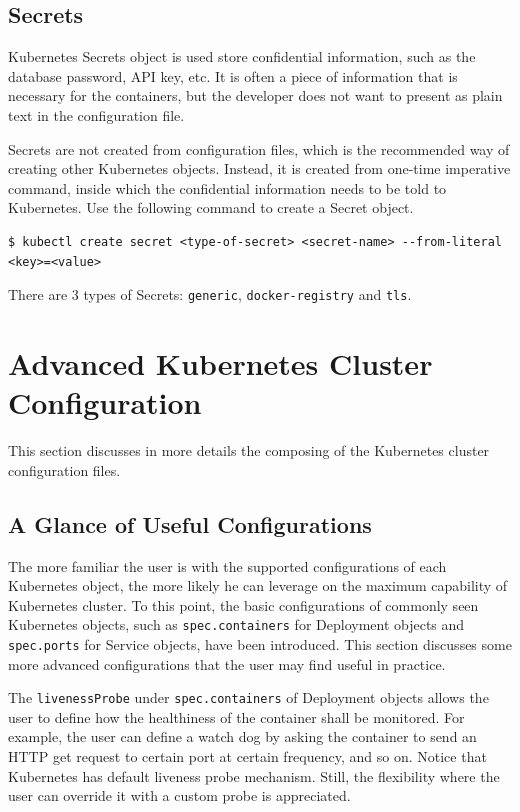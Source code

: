 \subsection{Secrets} \label{ch:vac:subsec:k8ssecrets}

Kubernetes Secrets object is used store confidential information, such as the database password, API key, etc. It is often a piece of information that is necessary for the containers, but the developer does not want to present as plain text in the configuration file.

Secrets are not created from configuration files, which is the recommended way of creating other Kubernetes objects. Instead, it is created from one-time imperative command, inside which the confidential information needs to be told to Kubernetes. Use the following command to create a Secret object.
\begin{lstlisting}
$ kubectl create secret <type-of-secret> <secret-name> --from-literal <key>=<value>
\end{lstlisting}
There are 3 types of Secrets: \verb|generic|, \verb|docker-registry| and \verb|tls|.

\section{Advanced Kubernetes Cluster Configuration} \label{ch:vac:sec:kubernetesconfiguration}

This section discusses in more details the composing of the Kubernetes cluster configuration files.

\subsection{A Glance of Useful Configurations}

The more familiar the user is with the supported configurations of each Kubernetes object, the more likely he can leverage on the maximum capability of Kubernetes cluster. To this point, the basic configurations of commonly seen Kubernetes objects, such as \verb|spec.containers| for Deployment objects and \verb|spec.ports| for Service objects, have been introduced. This section discusses some more advanced configurations that the user may find useful in practice.

The \verb|livenessProbe| under \verb|spec.containers| of Deployment objects allows the user to define how the healthiness of the container shall be monitored. For example, the user can define a watch dog by asking the container to send an HTTP get request to certain port at certain frequency, and so on. Notice that Kubernetes has default liveness probe mechanism. Still, the flexibility where the user can override it with a custom probe is appreciated.

